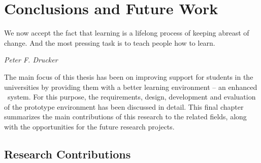 \chapter{Conclusions and Future Work\label{cha:conclusion}}
\epigraph{We now accept the fact that learning is a lifelong process of keeping
abreast of change. And the most pressing task is to teach people how to
learn.}{\textit{Peter F. Drucker}}
The main focus of this thesis has been on improving \LLLs support for students
in the universities by providing them with a better learning environment -- an
enhanced \ep~system. For this purpose, the requirements, design, development and
evaluation of the prototype environment has been discussed in detail. This final
chapter summarizes the main contributions of this research to the related
fields, along with the opportunities for the future research projects.

\section{Research Contributions}

